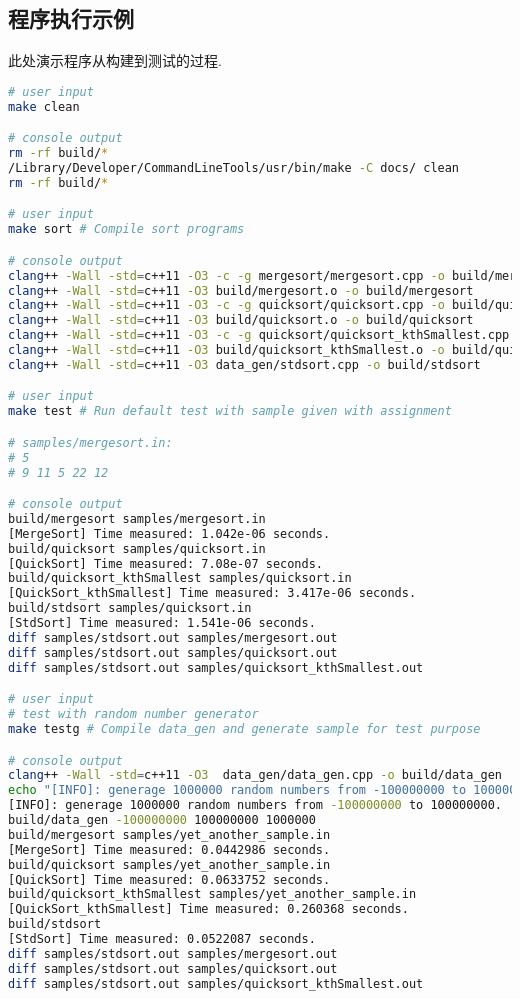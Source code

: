 \subsection{程序执行示例}
\label{sec:dpBench}
此处演示程序从构建到测试的过程.
\begin{lstlisting}[language=bash]
# user input
make clean

# console output
rm -rf build/*
/Library/Developer/CommandLineTools/usr/bin/make -C docs/ clean
rm -rf build/*

# user input
make sort # Compile sort programs

# console output
clang++ -Wall -std=c++11 -O3 -c -g mergesort/mergesort.cpp -o build/mergesort.o
clang++ -Wall -std=c++11 -O3 build/mergesort.o -o build/mergesort
clang++ -Wall -std=c++11 -O3 -c -g quicksort/quicksort.cpp -o build/quicksort.o
clang++ -Wall -std=c++11 -O3 build/quicksort.o -o build/quicksort
clang++ -Wall -std=c++11 -O3 -c -g quicksort/quicksort_kthSmallest.cpp -o build/quicksort_kthSmallest.o
clang++ -Wall -std=c++11 -O3 build/quicksort_kthSmallest.o -o build/quicksort_kthSmallest
clang++ -Wall -std=c++11 -O3 data_gen/stdsort.cpp -o build/stdsort

# user input
make test # Run default test with sample given with assignment

# samples/mergesort.in:
# 5
# 9 11 5 22 12

# console output
build/mergesort samples/mergesort.in
[MergeSort] Time measured: 1.042e-06 seconds.
build/quicksort samples/quicksort.in
[QuickSort] Time measured: 7.08e-07 seconds.
build/quicksort_kthSmallest samples/quicksort.in
[QuickSort_kthSmallest] Time measured: 3.417e-06 seconds.
build/stdsort samples/quicksort.in
[StdSort] Time measured: 1.541e-06 seconds.
diff samples/stdsort.out samples/mergesort.out
diff samples/stdsort.out samples/quicksort.out
diff samples/stdsort.out samples/quicksort_kthSmallest.out

# user input
# test with random number generator
make testg # Compile data_gen and generate sample for test purpose

# console output
clang++ -Wall -std=c++11 -O3  data_gen/data_gen.cpp -o build/data_gen
echo "[INFO]: generage 1000000 random numbers from -100000000 to 100000000."
[INFO]: generage 1000000 random numbers from -100000000 to 100000000.
build/data_gen -100000000 100000000 1000000
build/mergesort samples/yet_another_sample.in
[MergeSort] Time measured: 0.0442986 seconds.
build/quicksort samples/yet_another_sample.in
[QuickSort] Time measured: 0.0633752 seconds.
build/quicksort_kthSmallest samples/yet_another_sample.in
[QuickSort_kthSmallest] Time measured: 0.260368 seconds.
build/stdsort
[StdSort] Time measured: 0.0522087 seconds.
diff samples/stdsort.out samples/mergesort.out
diff samples/stdsort.out samples/quicksort.out
diff samples/stdsort.out samples/quicksort_kthSmallest.out


\end{lstlisting}
